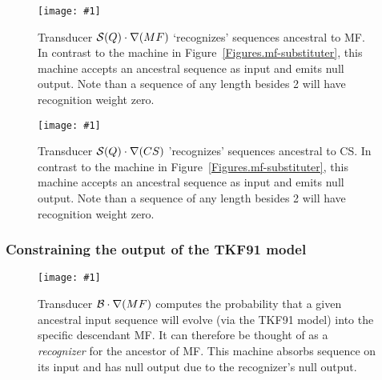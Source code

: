 \documentclass{article}
\newcommand{\figref}[1]{Figure~\ref{Figures.#1}}
\newcommand{\figlabel}[1]{\label{Figures.#1}}
\newcommand{\easyfig}[4]{
\begin{figure}
\texttt{[image: \#1]}
\caption{ \figlabel{#3} #4}
\end{figure}}
\newcommand{\pdffig}[2]{\easyfig{#1-fig.pdf}{}{#1}{#2}}
\newcommand{\tallpdffig}[2]{\easyfig{#1-fig.pdf}{height=.8\textheight}{#1}{#2}}
\newcommand\substitute{{\cal S}}
\newcommand\tkf{{\cal B}}
\newcommand\recognize{\nabla}
\begin{document}
\pdffig{substituter-mf}{Transducer $\substitute(Q) \cdot \recognize(MF)$ `recognizes' sequences ancestral to MF.  In contrast to the machine in \figref{mf-substituter}, this machine accepts an ancestral sequence as input and emits null output.  Note than a sequence of any length besides 2 will have recognition weight zero. }

\pdffig{substituter-cs}{Transducer $\substitute(Q) \cdot \recognize(CS)$ 'recognizes' sequences ancestral to CS.  In contrast to the machine in \figref{mf-substituter}, this machine accepts an ancestral sequence as input and emits null output.  Note than a sequence of any length besides 2 will have recognition weight zero. }






\subsubsection{Constraining the output of the TKF91 model}

\tallpdffig{tkf91-mf}{Transducer $\tkf \cdot \recognize(MF)$
computes the probability that a given ancestral input sequence will evolve (via the TKF91 model) into the specific descendant MF.  
It can therefore be thought of as a {\em recognizer} for the ancestor of MF.
This machine absorbs sequence on its input and has null output due to 
the recognizer's null output.}
\end{document}
